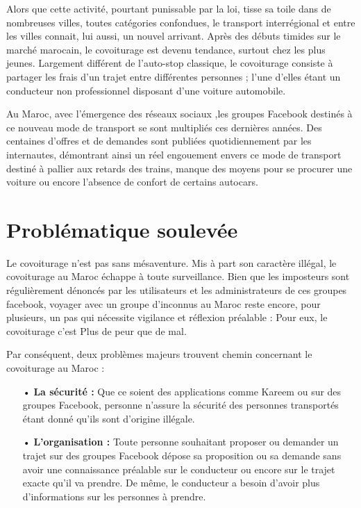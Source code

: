 \documentclass[a4paper]{report}
\begin{document}
\begin{spacing}{2}
Alors que cette activité, pourtant punissable par la loi, tisse sa toile dans de nombreuses villes, toutes catégories confondues, le transport interrégional et entre les villes connait, lui aussi, un nouvel arrivant. Après des débuts timides sur le marché marocain, le covoiturage est devenu tendance, surtout chez les plus jeunes. Largement différent de l'auto-stop classique, le covoiturage consiste à partager les frais d’un trajet entre différentes personnes ; l’une d’elles étant un conducteur non professionnel disposant d’une voiture automobile.

Au Maroc, avec l’émergence des réseaux sociaux ,les groupes Facebook destinés à ce nouveau mode de transport se sont multipliés ces dernières années. Des centaines d’offres et de demandes sont publiées quotidiennement par les internautes, démontrant ainsi un réel engouement envers ce mode de transport destiné à pallier aux retards des trains, manque des moyens pour se procurer une voiture ou encore l’absence de confort de certains autocars.


\section{Problématique soulevée}
\par 
Le covoiturage n’est pas sans mésaventure. Mis à part son caractère illégal, le covoiturage au Maroc échappe à toute surveillance. Bien que les imposteurs sont régulièrement dénoncés par les utilisateurs et les administrateurs de ces groupes facebook, voyager avec un groupe d’inconnus au Maroc reste encore, pour plusieurs, un pas qui nécessite vigilance et réflexion préalable : Pour eux, le covoiturage c'est \textsf{Plus de peur que de mal}.

\par 
Par conséquent, deux problèmes majeurs trouvent chemin concernant le covoiturage au Maroc :
\begin{itemize}
\item[•] \textbf{La sécurité :} Que ce soient des applications comme Kareem ou sur des groupes Facebook, personne n'assure la sécurité des personnes transportés étant donné qu'ils sont d'origine illégale. 
\item[•] \textbf{L'organisation :} Toute personne souhaitant proposer ou demander un trajet sur des groupes Facebook dépose sa proposition ou sa demande sans avoir une connaissance préalable sur le conducteur ou encore sur le trajet exacte qu'il va prendre. De même, le conducteur a besoin d'avoir plus d'informations sur les personnes à prendre.                 
\end{itemize}
\cleardoublepage

\end{spacing}
\end{document}

